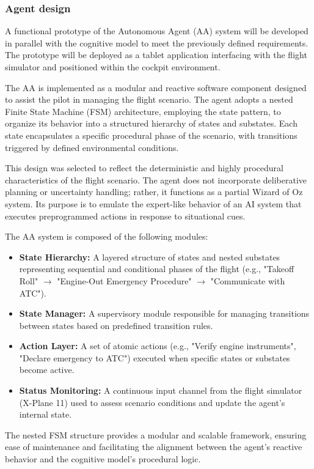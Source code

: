 \documentclass[12pt,a4paper]{article} %
\begin{document}
	
	\subsubsection{Agent design}
	A functional prototype of the Autonomous Agent (AA) system will be developed in parallel with the cognitive model to meet the previously defined requirements. The prototype will be deployed as a tablet application interfacing with the flight simulator and positioned within the cockpit environment.

	The AA is implemented as a modular and reactive software component designed to assist the pilot in managing the flight scenario. The agent adopts a nested Finite State Machine (FSM) architecture, employing the state pattern, to organize its behavior into a structured hierarchy of states and substates. Each state encapsulates a specific procedural phase of the scenario, with transitions triggered by defined environmental conditions.
	
	This design was selected to reflect the deterministic and highly procedural characteristics of the flight scenario. The agent does not incorporate deliberative planning or uncertainty handling; rather, it functions as a partial Wizard of Oz system. Its purpose is to emulate the expert-like behavior of an AI system that executes preprogrammed actions in response to situational cues.
	
	The AA system is composed of the following modules: 
	\begin{itemize} 
		\item \textbf{State Hierarchy:} A layered structure of states and nested substates representing sequential and conditional phases of the flight (e.g., "Takeoff Roll" $\rightarrow$ "Engine-Out Emergency Procedure" $\rightarrow$ "Communicate with ATC").
		\item \textbf{State Manager:} A supervisory module responsible for managing transitions between states based on predefined transition rules.
		\item \textbf{Action Layer:} A set of atomic actions (e.g., "Verify engine instruments", "Declare emergency to ATC") executed when specific states or substates become active.
		\item \textbf{Status Monitoring:} A continuous input channel from the flight simulator (X-Plane 11) used to assess scenario conditions and update the agent's internal state. 
	\end{itemize}
	
	The nested FSM structure provides a modular and scalable framework, ensuring ease of maintenance and facilitating the alignment between the agent's reactive behavior and the cognitive model's procedural logic.
\end{document}
